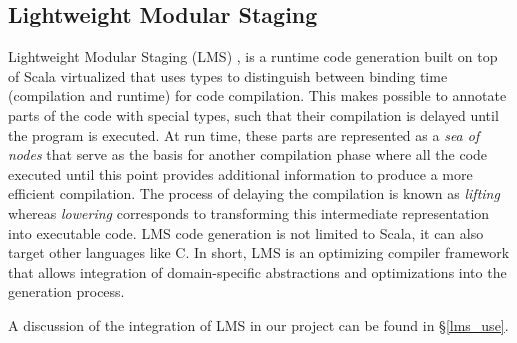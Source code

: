 \subsection{Lightweight Modular Staging} \label{bg_lms}
Lightweight Modular Staging (LMS) \cite{lms}, \cite{lms_thesis} is a runtime code generation built on top of Scala virtualized \cite{scala_virtualized} that uses types to distinguish between binding time (compilation and runtime) for code compilation. This makes possible to annotate parts of the code with special types, such that their compilation is delayed until the program is executed. At run time, these parts are represented as a \textit{sea of nodes} that serve as the basis for another compilation phase where all the code executed until this point provides additional information to produce a more efficient compilation. The process of delaying the compilation is known as \textit{lifting} whereas \textit{lowering} corresponds to transforming this intermediate representation into executable code. LMS code generation is not limited to Scala, it can also target other languages like C. In short, LMS is an optimizing compiler framework that allows integration of domain-specific abstractions and optimizations into the generation process.

A discussion of the integration of LMS in our project can be found in \S\ref{lms_use}.
